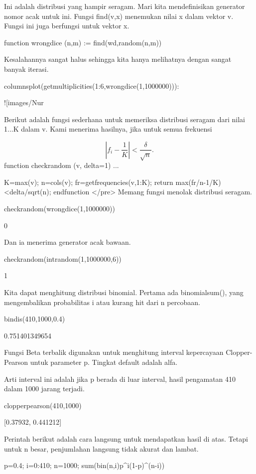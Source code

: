 \documentclass{article}
\begin{document}
Ini adalah distribusi yang hampir seragam. Mari kita mendefinisikan
generator nomor acak untuk ini. Fungsi find(v,x) menemukan nilai x
dalam vektor v. Fungsi ini juga berfungsi untuk vektor x.


\>function wrongdice (n,m) := find(wd,random(n,m))


Kesalahannya sangat halus sehingga kita hanya melihatnya dengan sangat
banyak iterasi.


\>columnsplot(getmultiplicities(1:6,wrongdice(1,1000000))):


![images/Nur%

Berikut adalah fungsi sederhana untuk memeriksa distribusi seragam
dari nilai 1...K dalam v. Kami menerima hasilnya, jika untuk semua
frekuensi


$$\left|f_i-\frac{1}{K}\right| < \frac{\delta}{\sqrt{n}}.$$\>function checkrandom (v, delta=1) ...


      K=max(v); n=cols(v);
      fr=getfrequencies(v,1:K);
      return max(fr/n-1/K)<delta/sqrt(n);
      endfunction
</pre>
Memang fungsi menolak distribusi seragam.


\>checkrandom(wrongdice(1,1000000))


    0

Dan ia menerima generator acak bawaan.


\>checkrandom(intrandom(1,1000000,6))


    1

Kita dapat menghitung distribusi binomial. Pertama ada binomialsum(),
yang mengembalikan probabilitas i atau kurang hit dari n percobaan.


\>bindis(410,1000,0.4)


    0.751401349654

Fungsi Beta terbalik digunakan untuk menghitung interval kepercayaan
Clopper-Pearson untuk parameter p. Tingkat default adalah alfa.


Arti interval ini adalah jika p berada di luar interval, hasil
pengamatan 410 dalam 1000 jarang terjadi.


\>clopperpearson(410,1000)


    [0.37932,  0.441212]

Perintah berikut adalah cara langsung untuk mendapatkan hasil di atas.
Tetapi untuk n besar, penjumlahan langsung tidak akurat dan lambat.


\>p=0.4; i=0:410; n=1000; sum(bin(n,i)\*p^i\*(1-p)^(n-i))
\end{document}

